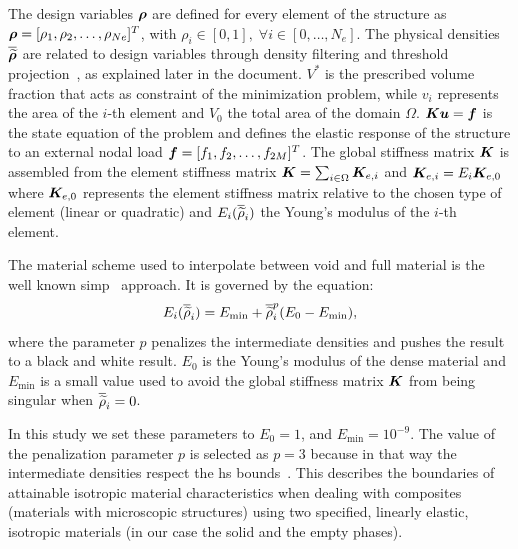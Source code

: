 The design variables $\bm{\rho}$ are defined for every element of the structure as $\bm{\rho} = [\rho_1, \rho_2, \ldots,\rho_{Ne}]^T$, with $\rho_i \in [0,1], \; \forall i \in [0,\dots,N_e]$. The physical densities $\bm{\overline{\widetilde{\rho}}}$ are related to design variables through density filtering and threshold projection~, as explained later in the document. $V^*$ is the prescribed volume fraction that acts as constraint of the minimization problem, while $v_i$ represents the area of the $i$-th element and $V_0$ the total area of the domain $\Omega$. $\bm{K}\bm{u} = \bm{f}$ is the state equation of the problem and defines the elastic response of the structure to an external nodal load $\bm{f}=[f_1, f_2, \ldots,f_{2M}]^T$. The global stiffness matrix $\bm{K}$ is assembled from the element stiffness matrix $\bm{K} = \sum_{i \in \Omega} \bm{K}_{e,i}$ and $\bm{K}_{e,i} = E_i \bm{K}_{e,0}$ where $\bm{K}_{e,0}$ represents the element stiffness matrix relative to the chosen type of element (linear or quadratic) and $E_i(\overline{\widetilde{\rho}}_i)$ the Young's modulus of the $i$-th element. 

The material scheme used to interpolate between void and full material is the well known \gls{simp}~ approach. It is governed by the equation:
\begin{equation}
    E_i(\overline{\widetilde{\rho}}_i) = E_{\textrm{min}} + \overline{\widetilde{\rho}}_i^p(E_0-E_{\textrm{min}}),
    \label{eq:03_simp}
\end{equation}
where the parameter $p$ penalizes the intermediate densities and pushes the result to a black and white result. $E_0$ is the Young's modulus of the dense material and $E_{\textrm{min}}$ is a small value used to avoid the global stiffness matrix $\bm{K}$ from being singular when $\overline{\widetilde{\rho}}_i=0$. 

In this study we set these parameters to $E_0 = 1$, and $E_{\textrm{min}} = 10^{-9}$. The value of the penalization parameter $p$ is selected as $p=3$ because in that way the intermediate densities respect the \gls{hs} bounds~. This describes the boundaries of attainable isotropic material characteristics when dealing with composites (materials with microscopic structures) using two specified, linearly elastic, isotropic materials (in our case the solid and the empty phases).
